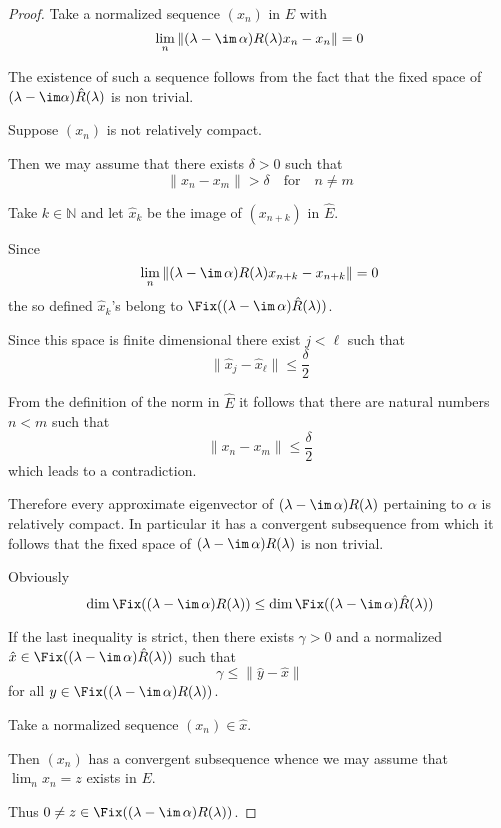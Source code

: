 \begin{proof}
Take a normalized sequence $(x_{n})$ in $E$ with
\[
\lim_{n}\|(\lambda - \im\,\alpha)R(\lambda)x_{n} - x_{n}\| = 0
\]

The existence of such a sequence follows from the fact that the fixed space of $(\lambda-\im\alpha)\hat{R}(\lambda)$ is non trivial.

Suppose $(x_{n})$ is not relatively compact.

Then we may assume that there exists $\delta > 0$ such that
\[
\|x_{n} - x_{m}\| > \delta \quad \text{for} \quad n \neq m
\]

Take $k \in \mathbb{N}$ and let $\hat{x}_{k}$ be the image of $(x_{n+k})$ in $\hat{E}$.

Since
\[
\lim_{n}\|(\lambda - \im\,\alpha)R(\lambda)x_{n+k} - x_{n+k}\| = 0
\]
the so defined $\hat{x}_{k}$'s belong to $\Fix((\lambda - \im\,\alpha)\hat{R}(\lambda))$.

Since this space is finite dimensional there exist $j < \ell$ such that
\[
\|\hat{x}_{j} - \hat{x}_{\ell}\| \leq \frac{\delta}{2}
\]

From the definition of the norm in $\hat{E}$ it follows that there are natural numbers $n < m$ such that
\[
\|x_{n} - x_{m}\| \leq \frac{\delta}{2}
\]
which leads to a contradiction.

Therefore every approximate eigenvector of $(\lambda - \im\,\alpha)R(\lambda)$ pertaining to $\alpha$ is relatively compact.
In particular it has a convergent subsequence from which it follows that the fixed space of $(\lambda - \im\,\alpha)R(\lambda)$ is non trivial.

Obviously
\[
\dim \Fix((\lambda - \im\,\alpha)R(\lambda)) \leq \dim \Fix((\lambda - \im\,\alpha)\hat{R}(\lambda))
\]






If the last inequality is strict, then there exists $\gamma > 0$ and a normalized $\hat{x} \in \Fix((\lambda - \im\,\alpha)\hat{R}(\lambda))$ such that
\[
\gamma \leq \|\hat{y} - \hat{x}\|
\]
for all $y \in \Fix((\lambda - \im\,\alpha)R(\lambda))$.

Take a normalized sequence $(x_{n}) \in \hat{x}$.

Then $(x_{n})$ has a convergent subsequence whence we may assume that $\lim_{n} x_{n} = z$ exists in $E$.

Thus $0 \neq z \in \Fix((\lambda - \im\,\alpha)R(\lambda))$.


\end{proof}
